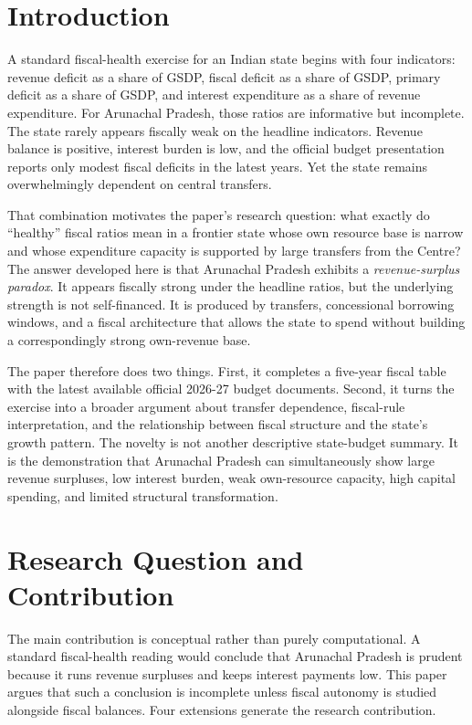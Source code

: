 \documentclass[11pt,a4paper]{article}
\begin{document}
\tableofcontents
\newpage

\section{Introduction}

A standard fiscal-health exercise for an Indian state begins with four indicators: revenue deficit as a share of GSDP, fiscal deficit as a share of GSDP, primary deficit as a share of GSDP, and interest expenditure as a share of revenue expenditure. For Arunachal Pradesh, those ratios are informative but incomplete. The state rarely appears fiscally weak on the headline indicators. Revenue balance is positive, interest burden is low, and the official budget presentation reports only modest fiscal deficits in the latest years. Yet the state remains overwhelmingly dependent on central transfers.

That combination motivates the paper's research question: what exactly do ``healthy'' fiscal ratios mean in a frontier state whose own resource base is narrow and whose expenditure capacity is supported by large transfers from the Centre? The answer developed here is that Arunachal Pradesh exhibits a \emph{revenue-surplus paradox}. It appears fiscally strong under the headline ratios, but the underlying strength is not self-financed. It is produced by transfers, concessional borrowing windows, and a fiscal architecture that allows the state to spend without building a correspondingly strong own-revenue base.

The paper therefore does two things. First, it completes a five-year fiscal table with the latest available official 2026-27 budget documents. Second, it turns the exercise into a broader argument about transfer dependence, fiscal-rule interpretation, and the relationship between fiscal structure and the state's growth pattern. The novelty is not another descriptive state-budget summary. It is the demonstration that Arunachal Pradesh can simultaneously show large revenue surpluses, low interest burden, weak own-resource capacity, high capital spending, and limited structural transformation.

\section{Research Question and Contribution}

The main contribution is conceptual rather than purely computational. A standard fiscal-health reading would conclude that Arunachal Pradesh is prudent because it runs revenue surpluses and keeps interest payments low. This paper argues that such a conclusion is incomplete unless fiscal autonomy is studied alongside fiscal balances. Four extensions generate the research contribution.
\end{document}
